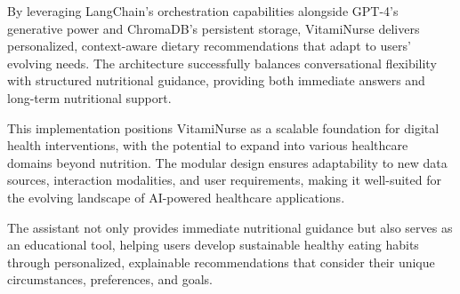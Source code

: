By leveraging LangChain's orchestration capabilities alongside GPT-4's generative power and ChromaDB's persistent storage, VitamiNurse delivers personalized, context-aware dietary recommendations that adapt to users' evolving needs. The architecture successfully balances conversational flexibility with structured nutritional guidance, providing both immediate answers and long-term nutritional support.

This implementation positions VitamiNurse as a scalable foundation for digital health interventions, with the potential to expand into various healthcare domains beyond nutrition. The modular design ensures adaptability to new data sources, interaction modalities, and user requirements, making it well-suited for the evolving landscape of AI-powered healthcare applications.

The assistant not only provides immediate nutritional guidance but also serves as an educational tool, helping users develop sustainable healthy eating habits through personalized, explainable recommendations that consider their unique circumstances, preferences, and goals.



